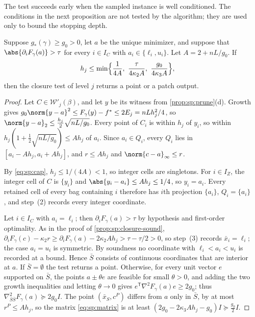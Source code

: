 The test succeeds early when the sampled instance is well conditioned. The
conditions in the next proposition are not tested by the algorithm; they
are used only to bound the stopping depth.

\begin{proposition}\label{prop:sp:closure-stop}
Suppose $g_*(\gamma)\ge g_0>0$, let $a$ be the unique minimizer, and suppose
that $\abs{\partial_iF_\gamma(a)}>\tau$ for every $i\in I_C$ with
$a_i\in\{\ell_i,u_i\}$. Let $A=2+nL/g_0$. If
\begin{equation}\label{eq:sp:cap}
 h_j\le\min\Bigl\{\frac1{4A},\ \frac{\tau}{4\kappa_2A},\
 \frac{g_0}{4\kappa_3A}\Bigr\},
\end{equation}
then the closure test of level $j$ returns a point or a patch output.
\end{proposition}

\begin{proof}
Let $C\in\mathcal W'_j(\beta)$, and let $y$ be its witness from
\cref{prop:sp:prune}(d). Growth gives $g_0\norm{y-a}^2\le F_\gamma(y)-f^*\le
2E_j=nLh_j^2/4$, so $\norm{y-a}_2\le\frac{h_j}2\sqrt{nL/g_0}$. Every point of
$C_i$ is within $h_j$ of $y_i$, so within
$h_j(1+\frac12\sqrt{nL/g_0})\le Ah_j$ of $a_i$. Since $a_i\in Q_i$, every
$Q_i$ lies in $[a_i-Ah_j,a_i+Ah_j]$, and $r\le Ah_j$ and
$\norm{c-a}_\infty\le r$.

By \eqref{eq:sp:cap}, $h_j\le1/(4A)<1$, so integer cells are singletons.
For $i\in I_Z$, the integer cell of $C$ is $\{y_i\}$ and
$\abs{y_i-a_i}\le Ah_j\le1/4$, so $y_i=a_i$. Every retained cell of every bag
containing $i$ therefore has $i$th projection $\{a_i\}$, $Q_i=\{a_i\}$, and
step~(2) records every integer coordinate.

Let $i\in I_C$ with $a_i=\ell_i$; then $\partial_iF_\gamma(a)>\tau$ by
hypothesis and first-order optimality. As in the proof of
\cref{prop:sp:closure-sound},
$\partial_iF_\gamma(c)-\kappa_2r\ge\partial_iF_\gamma(a)-2\kappa_2Ah_j>\tau-\tau/2>0$,
so step~(3) records $\bar x_i=\ell_i$; the case $a_i=u_i$ is symmetric. By
soundness no coordinate with $\ell_i<a_i<u_i$ is recorded at a bound. Hence
$\bar S$ consists of continuous coordinates that are interior at $a$. If
$\bar S=\emptyset$ the test returns a point. Otherwise, for every unit vector
$e$ supported on $\bar S$, the points $a\pm\theta e$ are feasible for small
$\theta>0$, and adding the two growth inequalities and letting
$\theta\to0$ gives $e^{\mathsf T}\nabla^2F_\gamma(a)e\ge2g_0$; thus
$\nabla^2_{\bar S\bar S}F_\gamma(a)\succeq2g_0I$. The point $(\bar x_S,c^P)$
differs from $a$ only in $\bar S$, by at most $r^P\le Ah_j$, so the matrix
\eqref{eq:sp:matrix} is at least
$(2g_0-2\kappa_3Ah_j-g_0)I\succeq\frac{g_0}2I$.
\end{proof}

